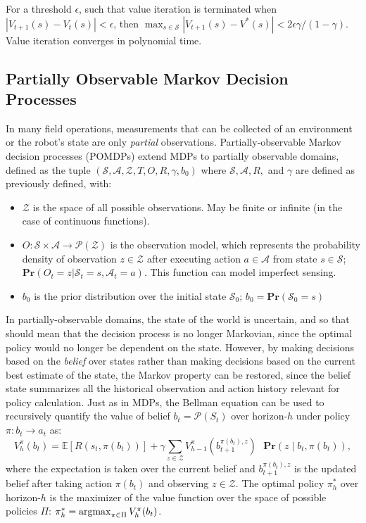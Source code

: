 For a threshold $\epsilon$, such that value iteration is terminated when $|V_{t+1}(s) - V_t(s)| < \epsilon$, then $\max_{s \in \mathcal{S}} | V_{t+1}(s) - V^*(s) | < 2\epsilon\gamma/(1-\gamma)$.
Value iteration converges in polynomial time.

\subsection{Partially Observable Markov Decision Processes}
In many field operations, measurements that can be collected of an environment or the robot's state are only \emph{partial} observations.
Partially-observable Markov decision processes\autocite{kaelbling1998planning} (POMDPs) extend MDPs to partially observable domains, defined as the tuple $(\mathcal{S}, \mathcal{A}, \mathcal{Z}, T, O, R, \gamma, b_0)$ where $\mathcal{S}, \mathcal{A}, R,$ and $\gamma$ are defined as previously defined, with:

\begin{itemize}
	\item $\mathcal{Z}$ is the space of all possible observations. May be finite or infinite (in the case of continuous functions).
	\item $O : \mathcal{S} \times \mathcal{A} \to \mathcal{P}(\mathcal{Z})$ is the observation model, which represents the probability density of observation $z \in \mathcal{Z}$ after executing action $a \in \mathcal{A}$ from state $s \in \mathcal{S}$; $\mathbf{Pr}(O_t = z | \mathcal{S}_t = s, \mathcal{A}_t = a)$. This function can model imperfect sensing.
	\item $b_0$ is the prior distribution over the initial state $\mathcal{S}_0$; $b_0 = \textbf{Pr}(\mathcal{S}_0 = s)$
\end{itemize}

In partially-observable domains, the state of the world is uncertain, and so that should mean that the decision process is no longer Markovian, since the optimal policy would no longer be dependent on the state.
However, by making decisions based on the \emph{belief} over states rather than making decisions based on the current best estimate of the state, the Markov property can be restored, since the belief state summarizes all the historical observation and action history relevant for policy calculation.
Just as in MDPs, the Bellman equation can be used to recursively quantify the value of belief $b_t = \mathcal{P}(S_t)$ over horizon-$h$ under policy $\pi: b_t \to a_t$ as: 
\begin{equation}
  V^{\pi}_h(b_t) = \mathbb{E}[R(s_t, \pi(b_t))] + \gamma \sum_{z \in \mathcal{Z}} V^{\pi}_{h-1}(b^{\pi(b_t), z}_{t+1}) \text{ }\textbf{Pr}(z \mid b_t, \pi(b_t)),
  \label{eq:pomdp_value}
\end{equation}
\noindent where the expectation is taken over the current belief and $b^{\pi(b_t), z}_{t+1}$ is the updated belief after taking action $\pi(b_t)$ and observing $z \in \mathcal{Z}$.
The optimal policy $\pi_h^*$ over horizon-$h$ is the maximizer of the value function over the space of possible policies $\Pi$: $\pi_h^* = \mathop\mathrm{arg max}_{\pi \in \Pi} V^{\pi}_h(b_t)$.


